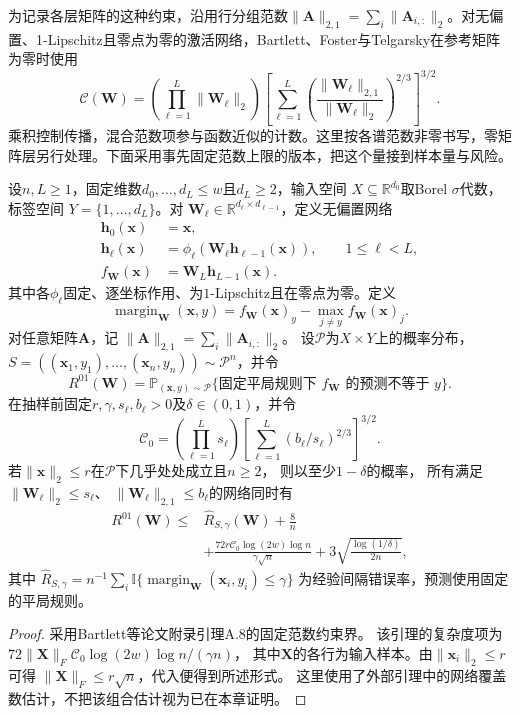 为记录各层矩阵的这种约束，沿用行分组范数$\|\bm A\|_{2,1}=\sum_i\|\bm A_{i,:}\|_2$。对无偏置、1-Lipschitz且零点为零的激活网络，Bartlett、Foster与Telgarsky在参考矩阵为零时使用
\begin{equation}
 \mathcal C(\bm W)=
 \left(\prod_{\ell=1}^L\|\bm W_\ell\|_2\right)
 \left[\sum_{\ell=1}^L
 \left(\frac{\|\bm W_\ell\|_{2,1}}{\|\bm W_\ell\|_2}\right)^{2/3}
 \right]^{3/2}.
 \label{eq:spectral-margin-bound}
\end{equation}
乘积控制传播，混合范数项参与函数近似的计数。这里按各谱范数非零书写，零矩阵层另行处理。下面采用事先固定范数上限的版本，把这个量接到样本量与风险。

\begin{theorem}[深层网络的谱复杂度与期望风险]
\label{thm:spectral-network-risk}
设$n,L\geq1$，固定维数$d_0,\ldots,d_L\leq w$且$d_L\geq2$，输入空间
$X\subseteq\mathbb R^{d_0}$取Borel $\sigma$代数，标签空间
$Y=\{1,\ldots,d_L\}$。对
$\bm W_\ell\in\mathbb R^{d_\ell\times d_{\ell-1}}$，定义无偏置网络
\[
\begin{aligned}
 \bm h_0(\bm x)&=\bm x,\\
 \bm h_\ell(\bm x)
 &=\phi_\ell(\bm W_\ell\bm h_{\ell-1}(\bm x)),
 \qquad 1\leq\ell<L,\\
 f_{\bm W}(\bm x)&=\bm W_L\bm h_{L-1}(\bm x).
\end{aligned}
\]
其中各$\phi_\ell$固定、逐坐标作用、为$1$-Lipschitz且在零点为零。定义
\[
 \operatorname{margin}_{\bm W}(\bm x,y)
 =f_{\bm W}(\bm x)_y-\max_{j\neq y}f_{\bm W}(\bm x)_j.
\]
对任意矩阵$\bm A$，记
$\|\bm A\|_{2,1}=\sum_i\|\bm A_{i,:}\|_2$。
设$\mathcal P$为$X\times Y$上的概率分布，
$S=((\bm x_1,y_1),\ldots,(\bm x_n,y_n))\sim\mathcal P^n$，并令
\[
 R^{01}(\bm W)
 =\mathbb P_{(\bm x,y)\sim\mathcal P}
   \{\text{固定平局规则下 }f_{\bm W}\text{ 的预测不等于 }y\}.
\]
在抽样前固定$r,\gamma,s_\ell,b_\ell>0$及$\delta\in(0,1)$，并令
\[
 \mathcal C_0=
 \left(\prod_{\ell=1}^L s_\ell\right)
 \left[\sum_{\ell=1}^L(b_\ell/s_\ell)^{2/3}\right]^{3/2}.
\]
若$\|\bm x\|_2\leq r$在$\mathcal P$下几乎处处成立且$n\geq2$，
则以至少$1-\delta$的概率，
所有满足$\|\bm W_\ell\|_2\leq s_\ell$、
$\|\bm W_\ell\|_{2,1}\leq b_\ell$的网络同时有
\begin{equation}
 \begin{aligned}
 R^{01}(\bm W)\leq{}&\hat R_{S,\gamma}(\bm W)+\frac8n\\
 &+\frac{72r\mathcal C_0\log(2w)\log n}{\gamma\sqrt n}
 +3\sqrt{\frac{\log(1/\delta)}{2n}},
 \end{aligned}
 \label{eq:spectral-risk-explicit}
\end{equation}
其中
$\hat R_{S,\gamma}=n^{-1}\sum_i
\mathbb I\{\operatorname{margin}_{\bm W}(\bm x_i,y_i)\leq\gamma\}$
为经验间隔错误率，预测使用固定的平局规则。
\end{theorem}
\begin{proof}
采用Bartlett等论文附录引理A.8的固定范数约束界。
该引理的复杂度项为
$72\|\bm X\|_F\mathcal C_0\log(2w)\log n/(\gamma n)$，
其中$\bm X$的各行为输入样本。由$\|\bm x_i\|_2\leq r$可得
$\|\bm X\|_F\leq r\sqrt n$，代入便得到所述形式。
这里使用了外部引理中的网络覆盖数估计，不把该组合估计视为已在本章证明。
\end{proof}

